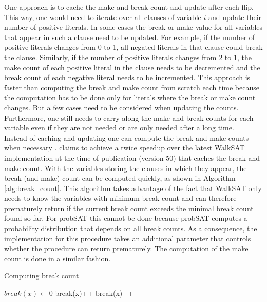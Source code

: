 \documentclass[12pt,a4paper]{article}
\begin{document}
One approach is to cache the make and break count and update after each flip. This way, one would need to iterate over all clauses of variable $i$ and update their number of positive literals. In some cases the break or make value for all variables that appear in such a clause need to be updated. For example, if the number of positive literals changes from 0 to 1, all negated literals in that clause could break the clause. Similarly, if the number of positive literals changes from 2 to 1, the make count of each positive literal in the clause needs to be decremented and the break count of each negative literal needs to be incremented. This approach is faster than computing the break and make count from scratch each time because the computation has to be done only for literals where the break or make count changes. But a few cases need to be considered when updating the counts. Furthermore, one still needs to carry along the make and break counts for each variable even if they are not needed or are only needed after a long time.\\
Instead of caching and updating one can compute the break and make counts when necessary \cite{Faster_WalkSAT}. \cite{Faster_WalkSAT} claims to achieve a twice speedup over the latest WalkSAT implementation at the time of publication \cite{kautz}(version 50) that caches the break and make count. With the variables storing the clauses in which they appear, the break (and make) count can be computed quickly, as shown in Algorithm \ref{alg:break_count}. This algorithm takes advantage of the fact that WalkSAT only needs to know the variables with minimum break count and can therefore prematurely return if the current break count exceeds the minimal break count found so far. For probSAT this cannot be done because probSAT computes a probability distribution that depends on all break counts. As a consequence, the implementation for this procedure takes an additional parameter that controls whether the procedure can return prematurely. The computation of the make count is done in a similar fashion.\\
\begin{algorithm}[ht]
  \caption{Computing break count}
  \label{alg:break_count}
  \begin{algorithmic}[1] 
    \State $break(x) \leftarrow 0$
            \State break(x)++
           \EndIf
            \State {}
            \EndIf
      \EndFor
    \Else
            \State break(x)++
          \EndIf
               \State {}
            \EndIf
        \EndFor
    \EndIf
    \State {}
    \EndProcedure
  \end{algorithmic}
\end{algorithm}
\end{document}
